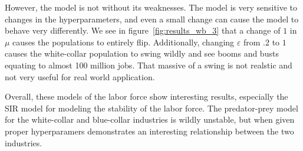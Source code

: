 \documentclass[11pt]{amsart}
\begin{document}
However, the model is not without its weaknesses. The model is very sensitive to changes in the hyperparameters, and even a small change can cause the model to behave very differently. We see
in figure~\ref{fig:results_wb_3} that a change of $1$ in $\mu$ causes the populations to entirely flip. Additionally, changing $\varepsilon$ from $.2$ to $1$ causes 
the white-collar population to swing wildly and see booms and busts equating to almost 100 million jobs. That massive of a swing is not realstic and not very useful for real world application.

Overall, these models of the labor force show interesting results, especially the SIR model for modeling the stability of the labor force. The predator-prey model for the white-collar and blue-collar
industries is wildly unstable, but when given proper hyperparamers demonstrates an interesting relationship between the two industries.



\newpage 


\end{document}
